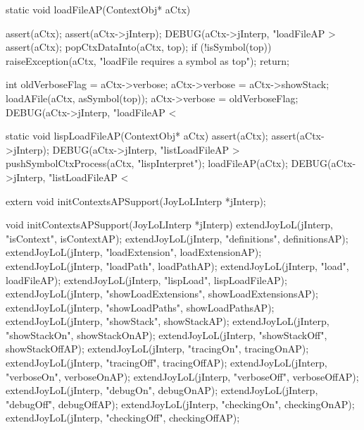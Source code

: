 \startCCode
static void loadFileAP(ContextObj* aCtx) {
  assert(aCtx);
  assert(aCtx->jInterp);
  DEBUG(aCtx->jInterp, "loadFileAP > %
  assert(aCtx);
  popCtxDataInto(aCtx, top);
  if (!isSymbol(top)) {
    raiseException(aCtx,
      "loadFile requires a symbol as top");
    return;
  }
  
  int oldVerboseFlag = aCtx->verbose;
  aCtx->verbose = aCtx->showStack;
  loadAFile(aCtx, asSymbol(top));
  aCtx->verbose = oldVerboseFlag;
  DEBUG(aCtx->jInterp, "loadFileAP < %
}
\stopCCode

\startCCode
static void lispLoadFileAP(ContextObj* aCtx) {
  assert(aCtx);
  assert(aCtx->jInterp);
  DEBUG(aCtx->jInterp, "listLoadFileAP > %
  pushSymbolCtxProcess(aCtx, "lispInterpret");
  loadFileAP(aCtx);
  DEBUG(aCtx->jInterp, "listLoadFileAP < %
}
\stopCCode

\startCHeader
extern void initContextsAPSupport(JoyLoLInterp *jInterp);
\stopCHeader
{}

\startCCode
void initContextsAPSupport(JoyLoLInterp *jInterp) {
  extendJoyLoL(jInterp, "isContext",           isContextAP);
  extendJoyLoL(jInterp, "definitions",         definitionsAP);
  extendJoyLoL(jInterp, "loadExtension",       loadExtensionAP);
  extendJoyLoL(jInterp, "loadPath",            loadPathAP);
  extendJoyLoL(jInterp, "load",                loadFileAP);
  extendJoyLoL(jInterp, "lispLoad",            lispLoadFileAP);
  extendJoyLoL(jInterp, "showLoadExtensions",  showLoadExtensionsAP);
  extendJoyLoL(jInterp, "showLoadPaths",       showLoadPathsAP);
  extendJoyLoL(jInterp, "showStack",           showStackAP);
  extendJoyLoL(jInterp, "showStackOn",         showStackOnAP);
  extendJoyLoL(jInterp, "showStackOff",        showStackOffAP);
  extendJoyLoL(jInterp, "tracingOn",           tracingOnAP);
  extendJoyLoL(jInterp, "tracingOff",          tracingOffAP);
  extendJoyLoL(jInterp, "verboseOn",           verboseOnAP);
  extendJoyLoL(jInterp, "verboseOff",          verboseOffAP);
  extendJoyLoL(jInterp, "debugOn",             debugOnAP);
  extendJoyLoL(jInterp, "debugOff",            debugOffAP);
  extendJoyLoL(jInterp, "checkingOn",          checkingOnAP);
  extendJoyLoL(jInterp, "checkingOff",         checkingOffAP);
}
\stopCCode